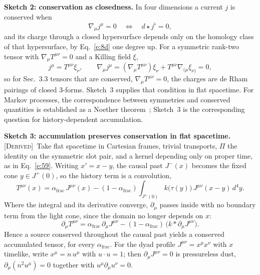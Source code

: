 \documentclass[10pt]{article}
\newcommand{\afrac}{\alpha_{\mathrm{frac}}}
\newcommand{\Derived}{\noindent\textsc{[Derived]}\ }
\begin{document}
\noindent\textbf{Sketch 2: conservation as closedness.} In four dimensions a current $j$ is conserved when
\begin{equation}
\nabla_\mu j^\mu=0\quad\Longleftrightarrow\quad d\star j^\flat=0,\tag{S2}\label{e:S2}
\end{equation}
and its charge through a closed hypersurface depends only on the homology class of that hypersurface, by Eq.~\eqref{e:8d} one degree up. For a symmetric rank-two tensor with $\nabla_\mu T^{\mu\nu}=0$ and a Killing field $\xi$,
\begin{equation}
j^\mu=T^{\mu\nu}\xi_\nu,\qquad \nabla_\mu j^\mu=(\nabla_\mu T^{\mu\nu})\xi_\nu+T^{\mu\nu}\nabla_{(\mu}\xi_{\nu)}=0,\tag{S3}\label{e:S3}
\end{equation}
so for Sec.~3.3 tensors that are conserved, $\nabla_\mu T^{\mu\nu}=0$, the charges are de Rham pairings of closed 3-forms. Sketch~3 supplies that condition in flat spacetime. For Markov processes, the correspondence between symmetries and conserved quantities is established as a Noether theorem~\cite{baezfong,gough}; Sketch~3 is the corresponding question for history-dependent accumulation.

\noindent\textbf{Sketch 3: accumulation preserves conservation in flat spacetime.} \Derived Take flat spacetime in Cartesian frames, trivial transports, $\Pi$ the identity on the symmetric slot pair, and a kernel depending only on proper time, as in Eq.~\eqref{e:59}. Writing $x'=x-y$, the causal past $J^-(x)$ becomes the fixed cone $y\in J^+(0)$, so the history term is a convolution,
\begin{equation}
T^{\mu\nu}(x)=\afrac\,J^{\mu\nu}(x)-(1-\afrac)\int_{J^+(0)}k\bigl(\tau(y)\bigr)\,J^{\mu\nu}(x-y)\,d^4y.\tag{S4}\label{e:S4}
\end{equation}
Where the integral and its derivative converge, $\partial_\mu$ passes inside with no boundary term from the light cone, since the domain no longer depends on $x$:
\begin{equation}
\partial_\mu T^{\mu\nu}=\afrac\,\partial_\mu J^{\mu\nu}-(1-\afrac)\,\bigl(k*\partial_\mu J^{\mu\nu}\bigr).\tag{S5}\label{e:S5}
\end{equation}
Hence a source conserved throughout the causal past yields a conserved accumulated tensor, for every $\afrac$. For the dyad profile $J^{\mu\nu}=x^\mu x^\nu$ with $x$ timelike, write $x^\mu=n\,u^\mu$ with $u\cdot u=1$; then $\partial_\mu J^{\mu\nu}=0$ is pressureless dust, $\partial_\mu(n^2u^\mu)=0$ together with $u^\mu\partial_\mu u^\nu=0$.
\end{document}
